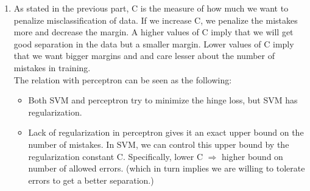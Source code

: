 \documentclass[letterpaper]{article}
\begin{document}
\begin{enumerate}
\item As stated in the previous part, C is the measure of how much we want to penalize misclassification of data. If we increase C, we penalize the mistakes more and decrease the margin. A higher values of C imply that we will get good separation in the data but a smaller margin. Lower values of C imply that we want bigger margins and and care lesser about the number of mistakes in training.\\
The relation with perceptron can be seen as the following:
\begin{itemize}
\item Both SVM and perceptron try to minimize the hinge loss, but SVM has regularization.
\item Lack of regularization in perceptron gives it an exact upper bound on the number of mistakes. In SVM, we can control this upper bound by the regularization constant C. Specifically, lower C $\Rightarrow$ higher bound on number of allowed errors. (which in turn implies we are willing to tolerate errors to get a better separation.)
\end{itemize}

\end{enumerate}
\end{document}
